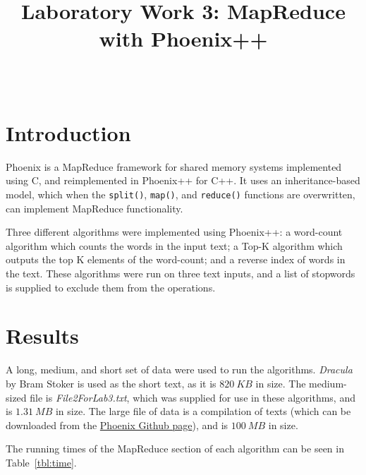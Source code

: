 \documentclass[12pt,onecolumn]{IEEEtran}
\begin{document}
	\title{Laboratory Work 3: MapReduce with Phoenix++}
	
	\author{\\
		}
	
	\maketitle
	\thispagestyle{empty}
	
	\section{Introduction}
	
	Phoenix is a MapReduce framework for shared memory systems implemented using C, and reimplemented in Phoenix++ for C++. It uses an inheritance-based model, which when the \verb|split()|, \verb|map()|, and \verb|reduce()| functions are overwritten, can implement MapReduce functionality.
	
	Three different algorithms were implemented using Phoenix++: a word-count algorithm which counts the words in the input text; a Top-K algorithm which outputs the top K elements of the word-count; and a reverse index of words in the text. These algorithms were run on three text inputs, and a list of stopwords is supplied to exclude them from the operations.
	
	\section{Results}
	
	A long, medium, and short set of data were used to run the algorithms. \textit{Dracula} by Bram Stoker is used as the short text, as it is $820~KB$ in size. The medium-sized file is \textit{File2ForLab3.txt}, which was supplied for use in these algorithms, and is $1.31~MB$ in size.  The large file of data is a compilation of texts (which can be downloaded from the \href{https://github.com/kozyraki/phoenix}{Phoenix Github page}), and is $100~MB$ in size.
	
	The running times of the MapReduce section of each algorithm can be seen in Table~\ref{tbl:time}.
	
\end{document}
